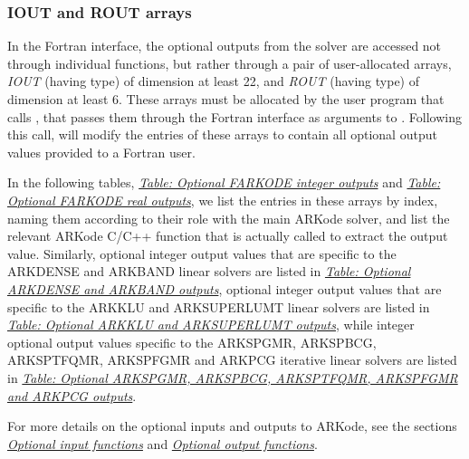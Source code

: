 \documentclass[letterpaper,10pt,english]{sphinxmanual}
\begin{document}
\subsubsection{IOUT and ROUT arrays}
\label{f_interface/Optional_output:iout-and-rout-arrays}
In the Fortran interface, the optional outputs from the
{\hyperref[f_interface/Usage:f/_/FARKODE]{}} solver are accessed not through individual
functions, but rather through a pair of user-allocated arrays, \emph{IOUT}
(having  type) of dimension at least 22, and \emph{ROUT}
(having  type) of dimension at least 6.  These arrays must
be allocated by the user program that calls {\hyperref[f_interface/Usage:f/_/FARKODE]{}}, that
passes them through the Fortran interface as arguments to
{\hyperref[f_interface/Usage:f/_/FARKMALLOC]{}}.  Following this call, {\hyperref[f_interface/Usage:f/_/FARKODE]{}} will
modify the entries of these arrays to contain all optional output
values provided to a Fortran user.

In the following tables, {\hyperref[f_interface/Optional_output:finterface-iouttable]{\emph{Table: Optional FARKODE integer outputs}}} and
{\hyperref[f_interface/Optional_output:finterface-routtable]{\emph{Table: Optional FARKODE real outputs}}}, we list the entries in these
arrays by index, naming them according to their role with the main
ARKode solver, and list the relevant ARKode C/C++ function that is
actually called to extract the output value.  Similarly, optional
integer output values that are specific to the ARKDENSE and ARKBAND
linear solvers are listed in {\hyperref[f_interface/Optional_output:finterface-dlsiouttable]{\emph{Table: Optional ARKDENSE and ARKBAND outputs}}}, optional
integer output values that are specific to the ARKKLU and ARKSUPERLUMT
linear solvers are listed in {\hyperref[f_interface/Optional_output:finterface-slsiouttable]{\emph{Table: Optional ARKKLU and ARKSUPERLUMT outputs}}}, while
integer optional output values specific to the ARKSPGMR,
ARKSPBCG, ARKSPTFQMR, ARKSPFGMR and ARKPCG iterative linear solvers
are listed in {\hyperref[f_interface/Optional_output:finterface-spilsiouttable]{\emph{Table: Optional ARKSPGMR, ARKSPBCG, ARKSPTFQMR, ARKSPFGMR and ARKPCG outputs}}}.

For more details on the optional inputs and outputs to ARKode, see
the sections {\hyperref[c_interface/User_callable:cinterface-optionalinputs]{\emph{Optional input functions}}} and
{\hyperref[c_interface/User_callable:cinterface-optionaloutputs]{\emph{Optional output functions}}}.
\end{document}

